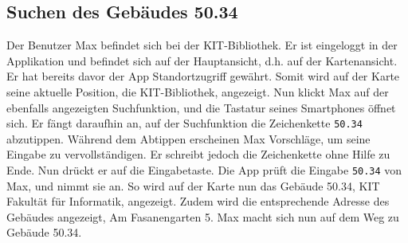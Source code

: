 \subsection{Suchen des Gebäudes 50.34}

Der Benutzer Max befindet sich bei der KIT-Bibliothek. Er ist eingeloggt in der Applikation und befindet sich auf der Hauptansicht, d.h. auf der Kartenansicht. Er hat bereits davor der App Standortzugriff gewährt. Somit wird auf der Karte seine aktuelle Position, die KIT-Bibliothek, angezeigt.
Nun klickt Max auf der ebenfalls angezeigten Suchfunktion, und die Tastatur seines Smartphones öffnet sich.
Er fängt daraufhin an, auf der Suchfunktion die Zeichenkette \texttt{50.34} abzutippen. Während dem Abtippen erscheinen Max Vorschläge, um seine Eingabe zu vervollständigen. Er schreibt jedoch die Zeichenkette ohne Hilfe zu Ende. Nun drückt er auf die Eingabetaste. Die App prüft die Eingabe \texttt{50.34} von Max, und nimmt sie an. So wird auf der Karte nun das Gebäude 50.34, KIT Fakultät für Informatik, angezeigt. Zudem wird die entsprechende Adresse des Gebäudes angezeigt, Am Fasanengarten 5. Max macht sich nun auf dem Weg zu Gebäude 50.34.